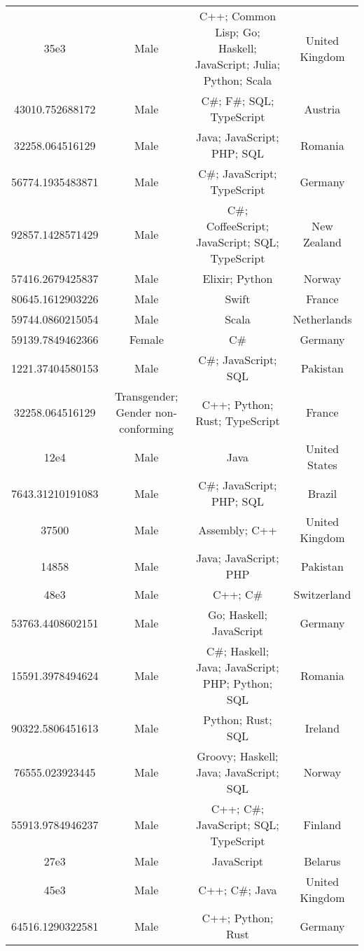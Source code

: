 \begin{center}
\begin{tabular}{ |c|c|c|c| }
35e3  &  Male  &  C++; Common Lisp; Go; Haskell; JavaScript; Julia; Python; Scala  &  United Kingdom  \\ 
43010.752688172  &  Male  &  C\#; F\#; SQL; TypeScript  &  Austria  \\ 
32258.064516129  &  Male  &  Java; JavaScript; PHP; SQL  &  Romania  \\ 
56774.1935483871  &  Male  &  C\#; JavaScript; TypeScript  &  Germany  \\ 
92857.1428571429  &  Male  &  C\#; CoffeeScript; JavaScript; SQL; TypeScript  &  New Zealand  \\ 
57416.2679425837  &  Male  &  Elixir; Python  &  Norway  \\ 
80645.1612903226  &  Male  &  Swift  &  France  \\ 
59744.0860215054  &  Male  &  Scala  &  Netherlands  \\ 
59139.7849462366  &  Female  &  C\#  &  Germany  \\ 
1221.37404580153  &  Male  &  C\#; JavaScript; SQL  &  Pakistan  \\ 
32258.064516129  &  Transgender; Gender non-conforming  &  C++; Python; Rust; TypeScript  &  France  \\ 
12e4  &  Male  &  Java  &  United States  \\ 
7643.31210191083  &  Male  &  C\#; JavaScript; PHP; SQL  &  Brazil  \\ 
37500  &  Male  &  Assembly; C++  &  United Kingdom  \\ 
14858  &  Male  &  Java; JavaScript; PHP  &  Pakistan  \\ 
48e3  &  Male  &  C++; C\#  &  Switzerland  \\ 
53763.4408602151  &  Male  &  Go; Haskell; JavaScript  &  Germany  \\ 
15591.3978494624  &  Male  &  C\#; Haskell; Java; JavaScript; PHP; Python; SQL  &  Romania  \\ 
90322.5806451613  &  Male  &  Python; Rust; SQL  &  Ireland  \\ 
76555.023923445  &  Male  &  Groovy; Haskell; Java; JavaScript; SQL  &  Norway  \\ 
55913.9784946237  &  Male  &  C++; C\#; JavaScript; SQL; TypeScript  &  Finland  \\ 
27e3  &  Male  &  JavaScript  &  Belarus  \\ 
45e3  &  Male  &  C++; C\#; Java  &  United Kingdom  \\ 
64516.1290322581  &  Male  &  C++; Python; Rust  &  Germany  \\ 

\end{tabular}
\end{center}
